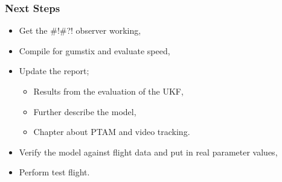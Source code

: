 \documentclass{beamer}
\begin{document}
\begin{frame}
    \frametitle{Next Steps}
    \begin{itemize}
        \item Get the \#!\#?! observer working,
        \item Compile for gumstix and evaluate speed,
        \item Update the report;
        \begin{itemize}
            \item Results from the evaluation of the UKF,
            \item Further describe the model,
            \item Chapter about PTAM and video tracking.
        \end{itemize}
        \item Verify the model against flight data and put in real parameter values,
        \item Perform test flight.
    \end{itemize}
\end{frame}
\end{document}
